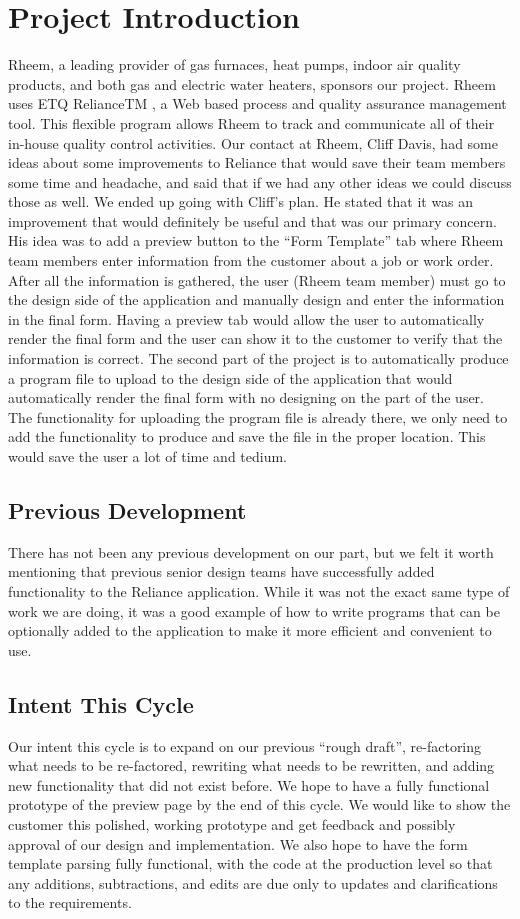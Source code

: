 \documentclass{article}
\begin{document}
\section{Project Introduction}
Rheem, a leading provider of gas furnaces, heat pumps, indoor air quality products, and both gas and electric water heaters, sponsors our project. Rheem uses ETQ RelianceTM , a Web based process and quality assurance management tool. This flexible program allows Rheem to track and communicate all of their in-house quality control activities.
Our contact at Rheem, Cliff Davis, had some ideas about some improvements to Reliance that would save their team members some time and headache, and said that if we had any other ideas we could discuss those as well. 
We ended up going with Cliff’s plan. He stated that it was an improvement that would definitely be useful and that was our primary concern.
His idea was to add a preview button to the “Form Template” tab where Rheem team members enter information from the customer about a job or work order. After all the information is gathered, the user (Rheem team member) must go to the design side of the application and manually design and enter the information in the final form. Having a preview tab would allow the user to automatically render the final form and the user can show it to the customer to verify that the information is correct.
The second part of the project is to automatically produce a program file to upload to the design side of the application that would automatically render the final form with no designing on the part of the user. The functionality for uploading the program file is already there, we only need to add the functionality to produce and save the file in the proper location. This would save the user a lot of time and tedium. 

\subsection{Previous Development}
There has not been any previous development on our part, but we felt it worth mentioning that previous senior design teams have successfully added functionality to the Reliance application. While it was not the exact same type of work we are doing, it was a good example of how to write programs that can be optionally added to the application to make it more efficient and convenient to use.

\subsection{Intent This Cycle}
Our intent this cycle is to expand on our previous “rough draft”, re-factoring what needs to be re-factored, rewriting what needs to be rewritten, and adding new functionality that did not exist before. We hope to have a fully functional prototype of the preview page by the end of this cycle. We would like to show the customer this polished, working prototype and get feedback and possibly approval of our design and implementation. 
We also hope to have the form template parsing fully functional, with the code at the production level so that any additions, subtractions, and edits are due only to updates and clarifications to the requirements.
\end{document}
